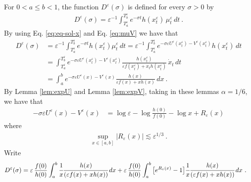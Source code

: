 \documentclass[reqno, 12pt, a4paper]{amsart}
\theoremstyle{plain}
\theoremstyle{definition}
\begin{document}
For $0<a\le b<1$, the function $D^\varepsilon (\sigma)$ is defined for every $\sigma>0$ by
\begin{equation}
\begin{split}
D^\varepsilon (\sigma)= \varepsilon^{-1} \int_{T_a^\varepsilon}^{T_b^\varepsilon} e^{-\sigma t} h(x^\varepsilon_t) \, \mu^\varepsilon_t \, dt \ .
\end{split}
\end{equation}
By using Eq. \eqref{eq:eq-sol-x} and Eq. \eqref{eq:muV} we have that
\begin{equation}
\begin{split}
D^\varepsilon (\sigma)&= \varepsilon^{-1} \int_{T_a^\varepsilon}^{T_b^\varepsilon} e^{-\sigma t} h(x^\varepsilon_t) \mu^\varepsilon_t \, dt =  \varepsilon^{-1} \int_{T^\varepsilon_a}^{T_b^\varepsilon} e^{-\sigma \varepsilon U^\varepsilon (x^\varepsilon_t) -V^\varepsilon (x^\varepsilon_t)  } h(x^\varepsilon_t) \, dt \\
&=  \int_{T_a^\varepsilon}^{T_b^\varepsilon} e^{-\sigma \varepsilon U^\varepsilon (x^\varepsilon_t) -V^\varepsilon (x^\varepsilon_t)  } \frac{h(x^\varepsilon_t)}{\varepsilon f(x^\varepsilon_t) + x_t h(x^\varepsilon_t)} \, {\dot x}_t \,  dt \\
&= \int_a^b e^{- \sigma \varepsilon U^\varepsilon (x) - V^\varepsilon (x) }\frac{h(x)}{\varepsilon f(x) + x h(x)} \, dx \ .
\end{split}
\end{equation}
By Lemma \ref{lem:expU} and Lemma \ref{lem:expV}, taking in these lemmas $\alpha=1/6$, we have that 
\begin{equation}
\begin{split}
- \sigma \varepsilon U^\varepsilon (x) - V^\varepsilon (x) &= \log \varepsilon -\log \frac{h(0)}{f(0)} - \log x + R_{\varepsilon} (x)
\end{split}
\end{equation}
where 
\begin{equation}
\begin{split}
\sup_{x \in[a,b]} \vert R_\varepsilon (x) \vert \lesssim \varepsilon^{1/3} \ .
\end{split}
\end{equation}
Write
\begin{equation}
\begin{split}
D^\varepsilon (\sigma)&= \varepsilon \, \frac{f(0)}{h(0)} \int_a^b \cfrac{1}{x} \cfrac{h(x)}{(\varepsilon f(x) +x h(x))} \, dx + \varepsilon \, \frac{f(0)}{h(0)} \int_a^b \big[e^{R_{\varepsilon} (x)} -1 \big] \cfrac{1}{x} \cfrac{h(x)}{(\varepsilon f(x) +x h(x))} \, dx \ .
\end{split}
\end{equation}
\end{document}
